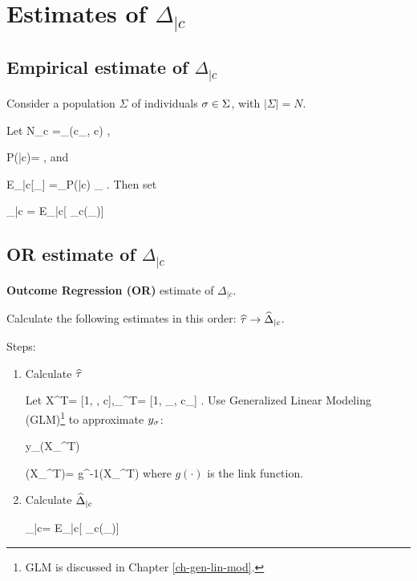 \section{Estimates of $\Delta_{|c}$}

\subsection{Empirical estimate of $\Delta_{|c}$ }
Consider a population $\Sigma$
of individuals $\sigma\in \Sigma$,
with $|\Sigma|=N$.

Let
\beq
N_c =\sum_\s \delta(c_\s, c)
\;,
\eeq

\beq
P(\s|c)= 
\;,
\eeq
and

\beq
E_{\s|c}[\xi_\s] =\sum_\s P(\s|c) \xi_\s
\;.
\eeq
Then set

\beq
\HAT{\Delta}_{|c} = 
{E_{\s|c}[
\lam_c(\tilx_\s)]}
\eeq

\subsection{OR estimate of $\Delta_{|c}$}

{\bf Outcome Regression (OR)} estimate
of $\Delta_{|c}$.

Calculate the
following estimates in this order:
${\widehat{\tau}}
\rightarrow{\widehat{\Delta}}_{|c}$.

Steps:
\begin{enumerate}
\item Calculate ${\widehat{\tau}}$

Let
\beq
{X}^T= [1, \tilx, c],_\s^T= [1, \tilx_\s, c_\s]
\;.
\eeq
Use Generalized 
Linear Modeling (GLM)\footnote{GLM
is discussed in Chapter \ref{ch-gen-lin-mod}.}
to approximate $y_\sigma$:

\beq
y_\s \approx {}(X_\s^T\HAT{\tau})
\eeq

\beq
{}(X_\s^T\HAT{\tau})= g^{-1}(X_\s^T\HAT{\tau})
\eeq
where $g(\cdot)$ is the link function.

\item Calculate ${\widehat{\Delta}}_{|c}$

\beq
\HAT{\Delta}_{|c}=
{E_{\s|c}[
\lam_c(\tilx_\s)]}
\label{eq-or-est}
\eeq

\end{enumerate}


 	






